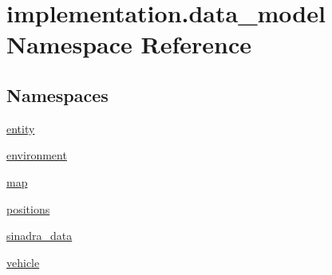 \hypertarget{namespaceimplementation_1_1data__model}{}\section{implementation.\+data\+\_\+model Namespace Reference}
\label{namespaceimplementation_1_1data__model}
\subsection*{Namespaces}
\begin{DoxyCompactItemize}
\item 
 \hyperlink{namespaceimplementation_1_1data__model_1_1entity}{entity}
\item 
 \hyperlink{namespaceimplementation_1_1data__model_1_1environment}{environment}
\item 
 \hyperlink{namespaceimplementation_1_1data__model_1_1map}{map}
\item 
 \hyperlink{namespaceimplementation_1_1data__model_1_1positions}{positions}
\item 
 \hyperlink{namespaceimplementation_1_1data__model_1_1sinadra__data}{sinadra\+\_\+data}
\item 
 \hyperlink{namespaceimplementation_1_1data__model_1_1vehicle}{vehicle}
\end{DoxyCompactItemize}
